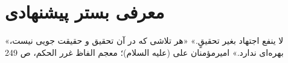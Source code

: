 \chapter{معرفی بستر پیشنهادی}
\label{ch4}
\bottomquote
{«لا ینفع اجتهاد بغیر تحقیقٍ.»}
{«هر تلاشی که در آن تحقیق و حقیقت جویی نیست، بهره‌ای ندارد.»}
{امیرمؤمنان علی (علیه السلام)؛ معجم الفاظ غرر الحکم، ص 249}
\clearpage


%
%
% 
% 
% 
% 



